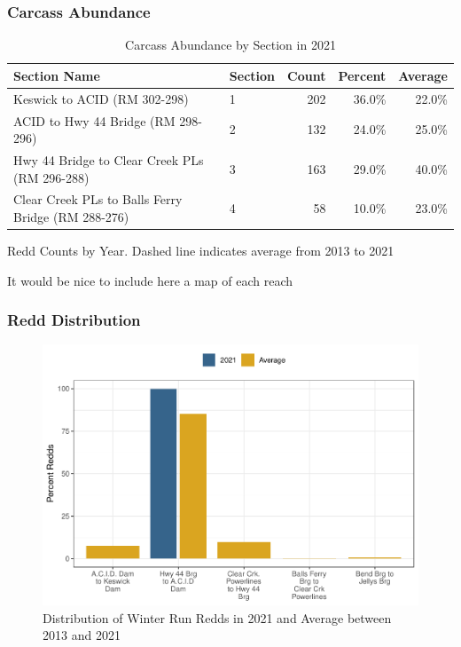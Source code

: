 \documentclass[
]{book}
\theoremstyle{definition}
\theoremstyle{definition}
\theoremstyle{definition}
\theoremstyle{definition}
\theoremstyle{remark}
\begin{document}
\hypertarget{carcass-abundance}{%
\subsubsection{Carcass Abundance}\label{carcass-abundance}}

\begin{table}
\centering
\caption{Carcass Abundance by Section in 2021}
\centering
\begin{tabular}[t]{llrrr}
\hline
Section Name & Section & Count & Percent & Average\\
\hline
Keswick to ACID (RM 302-298) & 1 & 202 & 36.0\% & 22.0\%\\
\hline
ACID to Hwy 44 Bridge (RM 298-296) & 2 & 132 & 24.0\% & 25.0\%\\
\hline
Hwy 44 Bridge to Clear Creek PLs (RM 296-288) & 3 & 163 & 29.0\% & 40.0\%\\
\hline
Clear Creek PLs to Balls Ferry Bridge (RM 288-276) & 4 & 58 & 10.0\% & 23.0\%\\
\hline
\end{tabular}
\end{table}

\label{fig:redds-fig}Redd Counts by Year. Dashed line indicates average from 2013 to 2021

It would be nice to include here a map of each reach

\hypertarget{redd-distribution}{%
\subsubsection{Redd Distribution}\label{redd-distribution}}

\begin{figure}
\centering
\includegraphics{_main_files/figure-latex/redddistrib-fig-1.pdf}
\caption{\label{fig:redddistrib-fig}Distribution of Winter Run Redds in 2021 and Average between 2013 and 2021}
\end{figure}
\end{document}
